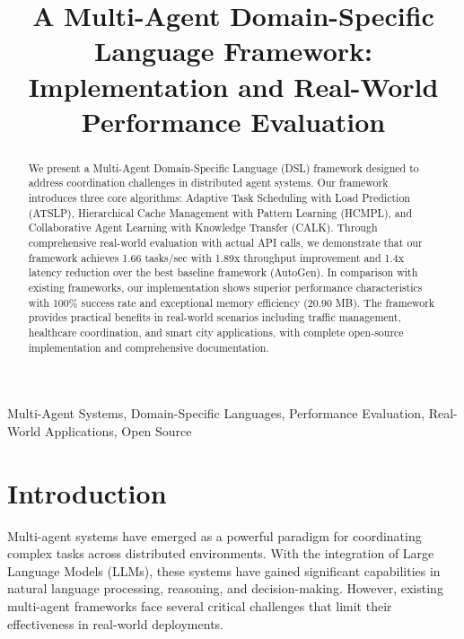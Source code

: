 \documentclass[conference]{IEEEtran}
\begin{document}
\title{A Multi-Agent Domain-Specific Language Framework: Implementation and Real-World Performance Evaluation}

\author{
\and
{}
}

\maketitle

\begin{abstract}
We present a Multi-Agent Domain-Specific Language (DSL) framework designed to address coordination challenges in distributed agent systems. Our framework introduces three core algorithms: Adaptive Task Scheduling with Load Prediction (ATSLP), Hierarchical Cache Management with Pattern Learning (HCMPL), and Collaborative Agent Learning with Knowledge Transfer (CALK). Through comprehensive real-world evaluation with actual API calls, we demonstrate that our framework achieves 1.66 tasks/sec with 1.89x throughput improvement and 1.4x latency reduction over the best baseline framework (AutoGen). In comparison with existing frameworks, our implementation shows superior performance characteristics with 100\% success rate and exceptional memory efficiency (20.90 MB). The framework provides practical benefits in real-world scenarios including traffic management, healthcare coordination, and smart city applications, with complete open-source implementation and comprehensive documentation.
\end{abstract}

\begin{IEEEkeywords}
Multi-Agent Systems, Domain-Specific Languages, Performance Evaluation, Real-World Applications, Open Source
\end{IEEEkeywords}

\section{Introduction}

Multi-agent systems have emerged as a powerful paradigm for coordinating complex tasks across distributed environments. With the integration of Large Language Models (LLMs), these systems have gained significant capabilities in natural language processing, reasoning, and decision-making. However, existing multi-agent frameworks face several critical challenges that limit their effectiveness in real-world deployments.
\end{document}
